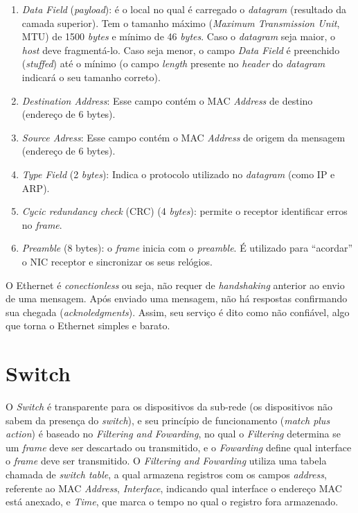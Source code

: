 \begin{enumerate}
\def\labelenumi{\arabic{enumi}.}
\tightlist
\item
  \emph{Data Field} (\emph{payload}): é o local no qual é carregado o
  \emph{datagram} (resultado da camada superior). Tem o tamanho máximo
  (\emph{Maximum Transmission Unit}, MTU) de 1500 \emph{bytes} e mínimo
  de 46 \emph{bytes}. Caso o \emph{datagram} seja maior, o \emph{host}
  deve fragmentá-lo. Caso seja menor, o campo \emph{Data Field} é
  preenchido (\emph{stuffed}) até o mínimo (o campo \emph{length}
  presente no \emph{header} do \emph{datagram} indicará o seu tamanho
  correto).
\item
  \emph{Destination Address}: Esse campo contém o MAC \emph{Address} de
  destino (endereço de 6 bytes).
\item
  \emph{Source Adress}: Esse campo contém o MAC \emph{Address} de origem
  da mensagem (endereço de 6 bytes).
\item
  \emph{Type Field} (2 \emph{bytes}): Indica o protocolo utilizado no
  \emph{datagram} (como IP e ARP).
\item
  \emph{Cycic redundancy check} (CRC) (4 \emph{bytes}): permite o
  receptor identificar erros no \emph{frame}.
\item
  \emph{Preamble} (8 bytes): o \emph{frame} inicia com o
  \emph{preamble}. É utilizado para ``acordar'' o NIC receptor e
  sincronizar os seus relógios.
\end{enumerate}

O Ethernet é \emph{conectionless} ou seja, não requer de
\emph{handshaking} anterior ao envio de uma mensagem. Após enviado uma
mensagem, não há respostas confirmando sua chegada
(\emph{acknoledgments}). Assim, seu serviço é dito como não confiável,
algo que torna o Ethernet simples e barato.

\hypertarget{switch}{%
\section{Switch}\label{switch}}

O \emph{Switch} é transparente para os dispositivos da sub-rede (os
dispositivos não sabem da presença do \emph{switch}), e seu princípio de
funcionamento (\emph{match plus action}) é baseado no \emph{Filtering
and Fowarding}, no qual o \emph{Filtering} determina se um \emph{frame}
deve ser descartado ou transmitido, e o \emph{Fowarding} define qual
interface o \emph{frame} deve ser transmitido. O \emph{Filtering and
Fowarding} utiliza uma tabela chamada de \emph{switch table}, a qual
armazena registros com os campos \emph{address}, referente ao MAC
\emph{Address}, \emph{Interface}, indicando qual interface o endereço
MAC está anexado, e \emph{Time}, que marca o tempo no qual o registro
fora armazenado.

